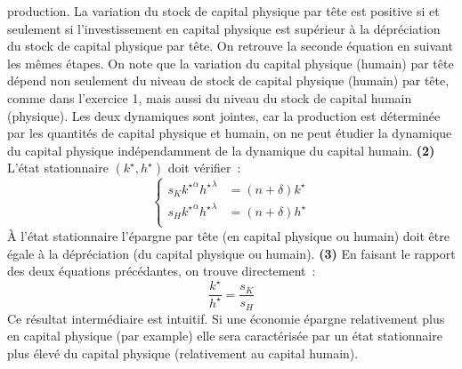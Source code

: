 \documentclass[10pt,a4paper,notitlepage,twocolumn]{article}
\newcommand{\question}[1]{\textbf{(#1)}}
\begin{document}
production. La variation du stock de capital physique par tête est
positive si et seulement si l'investissement en capital physique est
supérieur à la dépréciation du stock de capital physique par tête. On
retrouve la seconde équation en suivant les mêmes étapes. On note que
la variation du capital physique (humain) par tête dépend non
seulement du niveau de stock de capital physique (humain) par tête,
comme dans l'exercice 1, mais aussi du niveau du stock de capital
humain (physique). Les deux dynamiques sont jointes, car la production
est déterminée par les quantités de capital physique et humain, on ne
peut étudier la dynamique du capital physique indépendamment de la
dynamique du capital humain. \question{2} L'état stationnaire $(k^{\star}, h^{\star})$ doit vérifier :
\[
  \begin{cases}
    s_{K}\left. k^{\star}\right.^{\alpha}\left. h^{\star}\right.^{\lambda} &= (n+\delta)k^{\star}\\
    s_{H}\left. k^{\star}\right.^{\alpha}\left. h^{\star}\right.^{\lambda} &= (n+\delta)h^{\star}\\
  \end{cases}
\]
À l'état stationnaire l'épargne par tête (en capital physique ou
humain) doit être égale à la dépréciation (du capital physique ou
humain). \question{3} En faisant le rapport des deux équations
précédantes, on trouve directement :
\[
\frac{k^{\star}}{h^{\star}} = \frac{s_{K}}{s_{H}}
\]
Ce résultat intermédiaire est intuitif. Si une économie épargne
relativement plus en capital physique (par example) elle sera
caractérisée par un état stationnaire plus élevé du capital physique
(relativement au capital humain).
\end{document}
